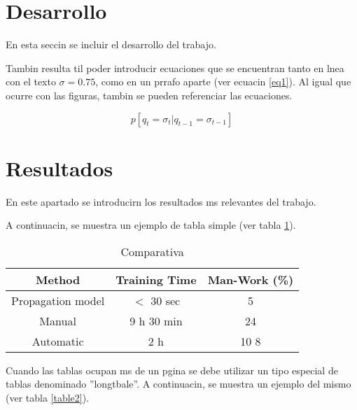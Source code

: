 \section{Desarrollo}

En esta seccin se incluir el desarrollo del trabajo.

Tambin resulta til poder introducir ecuaciones que se encuentran tanto en lnea con el texto $\sigma=0.75$, como en un prrafo aparte (ver ecuacin \ref{eq1}). Al igual que ocurre con las figuras, tambin se pueden referenciar las ecuaciones. 


\begin{equation}
  p[q_t=\sigma_t|q_{t-1}=\sigma_{t-1}]\label{eq1}
\end{equation}



\section{Resultados}
En este apartado se introducirn los resultados ms relevantes del trabajo.

A continuacin, se muestra un ejemplo de tabla simple (ver tabla \ref{table1}).

\begin{table}
  \renewcommand{\arraystretch}{1.3}
  \caption{Comparativa}
  \label{table1}
  \begin{center}
    \begin{tabular}{|c|c|c|}
      \hline
      Method & Training Time & Man-Work (\%)\\
      \hline
      Propagation model & $<$ 30 sec & 5\\
      \hline
      Manual & 9 h 30 min & 24\\
      \hline
      Automatic & 2 h & 10 8\\
      \hline
    \end{tabular}
  \end{center}
\end{table}

Cuando las tablas ocupan ms de un pgina se debe utilizar un tipo especial de tablas denominado ''longtbale''. A continuacin, se muestra un ejemplo del mismo (ver tabla \ref{table2}).

